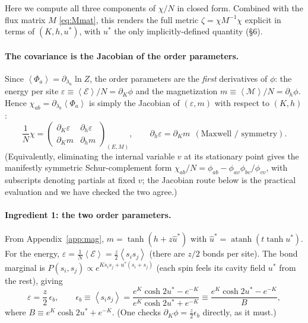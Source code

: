 \documentclass[11pt]{article}
\newcommand{\atanh}{\operatorname{atanh}}
\newcommand{\eq}{\mathcal{E}}
\newcommand{\mg}{\mathcal{M}}
\newcommand{\avg}[1]{\left\langle #1 \right\rangle}
\begin{document}
Here we compute all three components of $\chi/N$ in closed form. Combined with the flux matrix $M$
\eqref{eq:Mmat}, this renders the full metric $\zeta=\chi M^{-1}\chi$ explicit in terms of
$(K,h,u^*)$, with $u^*$ the only implicitly-defined quantity (\S6).

\paragraph{The covariance is the Jacobian of the order parameters.}
Since $\avg{\Phi_a}=\partial_{\lambda_a}\ln Z$, the order parameters are the \emph{first} derivatives
of $\phi$: the energy per site $\varepsilon\equiv\avg{\eq}/N=\partial_K\phi$ and the magnetization
$m\equiv\avg{\mg}/N=\partial_h\phi$. Hence $\chi_{ab}=\partial_{\lambda_b}\avg{\Phi_a}$ is simply the
Jacobian of $(\varepsilon,m)$ with respect to $(K,h)$:
\begin{equation}
\frac1N\chi=\begin{pmatrix}\partial_K\varepsilon & \partial_h\varepsilon\\[2pt]\partial_K m & \partial_h m\end{pmatrix}_{(E,M)},
\qquad \partial_h\varepsilon=\partial_K m\ \ (\text{Maxwell / symmetry}).
\end{equation}
(Equivalently, eliminating the internal variable $v$ at its stationary point gives the manifestly
symmetric Schur-complement form $\chi_{ab}/N=\phi_{ab}-\phi_{av}\phi_{bv}/\phi_{vv}$, with subscripts
denoting partials at fixed $v$; the Jacobian route below is the practical evaluation and we have
checked the two agree.)

\paragraph{Ingredient 1: the two order parameters.}
From Appendix~\ref{app:mag}, $m=\tanh(h+z\hat u^*)$ with $\hat u^*=\atanh(t\tanh u^*)$. For the energy,
$\varepsilon=\tfrac1N\avg{\eq}=\tfrac{z}{2}\avg{s_is_j}$ (there are $z/2$ bonds per site). The bond
marginal is $P(s_i,s_j)\propto e^{Ks_is_j+u^*(s_i+s_j)}$ (each spin feels its cavity field $u^*$ from
the rest), giving
\begin{equation}
\varepsilon=\frac z2\,\epsilon_b,\qquad
\epsilon_b\equiv\avg{s_is_j}=\frac{e^{K}\cosh2u^*-e^{-K}}{e^{K}\cosh2u^*+e^{-K}}\equiv\frac{e^K\cosh2u^*-e^{-K}}{B},
\end{equation}
where $B\equiv e^{K}\cosh2u^*+e^{-K}$. (One checks $\partial_K\phi=\tfrac z2\epsilon_b$ directly, as it
must.)
\end{document}
